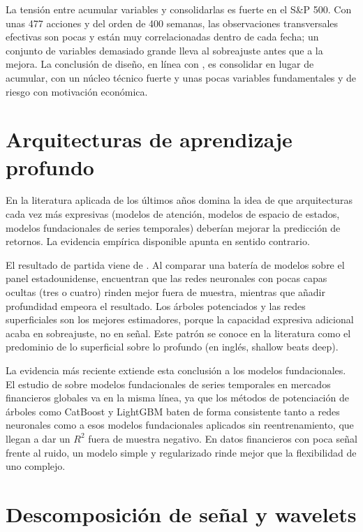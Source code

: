 La tensión entre acumular variables y consolidarlas es fuerte en el S\&P 500. Con unas 477
acciones y del orden de 400 semanas, las observaciones transversales efectivas son pocas y
están muy correlacionadas dentro de cada fecha; un conjunto de variables demasiado grande
lleva al sobreajuste antes que a la mejora. La conclusión de diseño, en línea con
\textcite{gu2020empirical}, es consolidar en lugar de acumular, con un núcleo técnico fuerte y
unas pocas variables fundamentales y de riesgo con motivación económica.

\section{Arquitecturas de aprendizaje profundo}

En la literatura aplicada de los últimos años domina la idea de que arquitecturas cada vez
más expresivas (modelos de atención, modelos de espacio de estados, modelos fundacionales
de series temporales) deberían mejorar la predicción de retornos. La evidencia empírica
disponible apunta en sentido contrario.

El resultado de partida viene de \textcite{gu2020empirical}. Al comparar una batería de
modelos sobre el panel estadounidense, encuentran que las redes neuronales con pocas capas
ocultas (tres o cuatro) rinden mejor fuera de muestra, mientras que añadir profundidad
empeora el resultado. Los árboles potenciados y las redes superficiales son los mejores
estimadores, porque la capacidad expresiva adicional acaba en sobreajuste, no en señal. Este
patrón se conoce en la literatura como el predominio de lo superficial sobre lo profundo
(en inglés, shallow beats deep).

La evidencia más reciente extiende esta conclusión a los modelos fundacionales. El
estudio de \textcite{rahimikia2025machine} sobre modelos fundacionales de series
temporales en mercados financieros globales va en la misma línea, ya que los métodos de
potenciación de árboles como CatBoost y LightGBM \autocite{ke2017lightgbm} baten de forma
consistente tanto a redes neuronales como a esos modelos fundacionales aplicados sin
reentrenamiento, que llegan a dar un $R^2$ fuera de muestra negativo. En datos financieros
con poca señal frente al ruido, un modelo simple y regularizado rinde mejor que la
flexibilidad de uno complejo.

\section{Descomposición de señal y wavelets}

